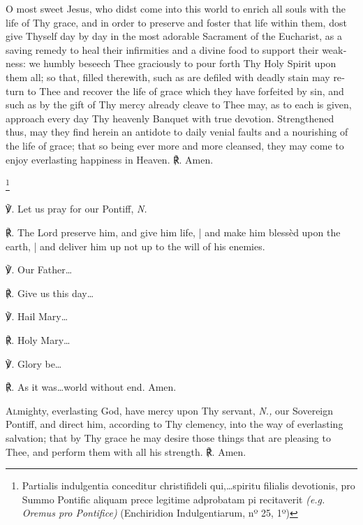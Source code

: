 \documentclass[11pt]{book}
\begin{document}


\begin{otherlanguage}{english}{\par}\end{otherlanguage}

\begin{otherlanguage}{english}

\lettrine{O}{} most sweet Jesus, who didst come into this world to enrich all souls with the life of Thy grace, and in order to preserve and foster that life within them, dost give Thyself day by day in the most adorable Sacrament of the Eucharist, as a saving remedy to heal their infirmities and a divine food to support their weakness: we humbly beseech Thee graciously to pour forth Thy Holy Spirit upon them all; so that, filled therewith, such as are defiled with deadly stain may return to Thee and recover the life of grace which they have forfeited by sin, and such as by the gift of Thy mercy already cleave to Thee may, as to each is given, approach every day Thy heavenly Banquet with true devotion. Strengthened thus, may they find herein an antidote to daily venial faults and a nourishing of the life of grace; that so being ever more and more cleansed, they may come to enjoy everlasting happiness in Heaven. ℟. Amen.

\footnote{\raggedright{Partialis indulgentia conceditur christifideli qui,…spiritu filialis devotionis, pro Summo Pontific aliquam prece legitime adprobatam pi recitaverit \textit{(e.g. Oremus pro Pontifice)} (Enchiridion Indulgentiarum, nº 25, 1º)}}

\noindent ℣. Let us pray for our Pontiff, \textit{N.}

\noindent ℟. The Lord preserve him, and give him life, | and make him blessèd upon the earth, | and deliver him up not up to the will of his enemies.

\noindent ℣. Our Father…

\noindent ℟. Give us this day…

\noindent ℣. Hail Mary…

\noindent ℟. Holy Mary…

\noindent ℣.  Glory be…

\noindent ℟. As it was…world without end. Amen.


\lettrine{A}{l}mighty, everlasting God, have mercy upon Thy servant, \textit{N.,} our Sovereign Pontiff, and direct him, according to Thy clemency, into the way of everlasting salvation; that by Thy grace he may desire those things that are pleasing to Thee, and perform them with all his strength. ℟. Amen.


\end{otherlanguage}
\end{document}
